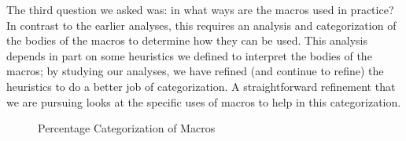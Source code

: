 The third question we asked was: in what ways are the macros used in
practice?  In contrast to the earlier analyses, this requires an
analysis and categorization of the bodies of the macros to determine
how they can be used.  This analysis depends in part on some
heuristics we defined to interpret the bodies of the macros; by
studying our analyses, we have refined (and continue to refine) the
heuristics to do a better job of categorization.  A straightforward
refinement that we are pursuing looks at the specific uses of macros
to help in this categorization.

\begin{figure}
{\small
  \setlength{\tabcolsep}{.25em}
}
\caption{Percentage Categorization of Macros\label{fig:categorization}}
\end{figure}

